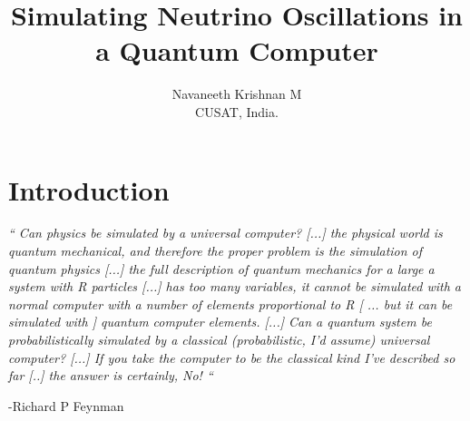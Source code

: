 \documentclass[12pt,a4paper]{report}
\title{
	\huge Simulating Neutrino Oscillations in a Quantum Computer}
\author{\large Navaneeth Krishnan M\\
	\small CUSAT, India.}
\begin{document}
\maketitle
\pagebreak	
\chapter*{Introduction}
\emph{“ Can physics be simulated by a universal computer? [...] the physical world is quantum mechanical, and therefore the proper problem is the simulation of quantum physics [...] the full description of quantum mechanics for a large a system with R particles [...] has too many variables, it cannot be simulated with a normal computer with a number of elements proportional to R [ ... but it can be simulated with ] quantum computer elements. [...] Can a quantum system be probabilistically simulated by a classical (probabilistic, I’d assume) universal computer? [...] If you take the computer to be the classical kind I’ve described so far [..] the answer is certainly, No! “} 
\begin{flushright}
-Richard P Feynman \cite{feynman82}\cite{nielsen}
\end{flushright}
\end{document}
